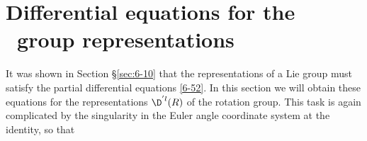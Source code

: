 \section[Differential equations for the group representations]{Differential equations for the \\\qquad \ group representations}

It was shown in Section \S\eqref{sec:6-10} that the representations of a Lie group must satisfy the partial differential equations \eqref{6-52}. In this section we will obtain these equations for the representations $\D^{'l}(R)$ of the rotation group. This task is again complicated by the singularity in the Euler angle coordinate system at the identity, so that


\endinput  %